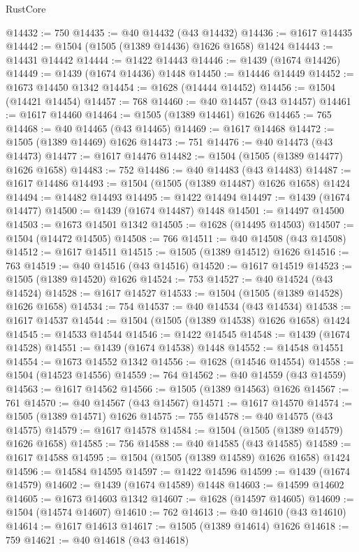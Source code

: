 \begin{lexlean}{RustCore}
\begin{coremodule}
@14432 := 750
@14435 := @40 @14432 (@43 @14432)
@14436 := @1617 @14435
@14442 := @1504 (@1505 (@1389 @14436) @1626 @1658) @1424
@14443 := @14431 @14442
@14444 := @1422 @14443
@14446 := @1439 (@1674 @14426)
@14449 := @1439 (@1674 @14436) @1448
@14450 := @14446 @14449
@14452 := @1673 @14450 @1342
@14454 := @1628 (@14444 @14452)
@14456 := @1504 (@14421 @14454)
@14457 := 768
@14460 := @40 @14457 (@43 @14457)
@14461 := @1617 @14460
@14464 := @1505 (@1389 @14461) @1626
@14465 := 765
@14468 := @40 @14465 (@43 @14465)
@14469 := @1617 @14468
@14472 := @1505 (@1389 @14469) @1626
@14473 := 751
@14476 := @40 @14473 (@43 @14473)
@14477 := @1617 @14476
@14482 := @1504 (@1505 (@1389 @14477) @1626 @1658)
@14483 := 752
@14486 := @40 @14483 (@43 @14483)
@14487 := @1617 @14486
@14493 := @1504 (@1505 (@1389 @14487) @1626 @1658) @1424
@14494 := @14482 @14493
@14495 := @1422 @14494
@14497 := @1439 (@1674 @14477)
@14500 := @1439 (@1674 @14487) @1448
@14501 := @14497 @14500
@14503 := @1673 @14501 @1342
@14505 := @1628 (@14495 @14503)
@14507 := @1504 (@14472 @14505)
@14508 := 766
@14511 := @40 @14508 (@43 @14508)
@14512 := @1617 @14511
@14515 := @1505 (@1389 @14512) @1626
@14516 := 763
@14519 := @40 @14516 (@43 @14516)
@14520 := @1617 @14519
@14523 := @1505 (@1389 @14520) @1626
@14524 := 753
@14527 := @40 @14524 (@43 @14524)
@14528 := @1617 @14527
@14533 := @1504 (@1505 (@1389 @14528) @1626 @1658)
@14534 := 754
@14537 := @40 @14534 (@43 @14534)
@14538 := @1617 @14537
@14544 := @1504 (@1505 (@1389 @14538) @1626 @1658) @1424
@14545 := @14533 @14544
@14546 := @1422 @14545
@14548 := @1439 (@1674 @14528)
@14551 := @1439 (@1674 @14538) @1448
@14552 := @14548 @14551
@14554 := @1673 @14552 @1342
@14556 := @1628 (@14546 @14554)
@14558 := @1504 (@14523 @14556)
@14559 := 764
@14562 := @40 @14559 (@43 @14559)
@14563 := @1617 @14562
@14566 := @1505 (@1389 @14563) @1626
@14567 := 761
@14570 := @40 @14567 (@43 @14567)
@14571 := @1617 @14570
@14574 := @1505 (@1389 @14571) @1626
@14575 := 755
@14578 := @40 @14575 (@43 @14575)
@14579 := @1617 @14578
@14584 := @1504 (@1505 (@1389 @14579) @1626 @1658)
@14585 := 756
@14588 := @40 @14585 (@43 @14585)
@14589 := @1617 @14588
@14595 := @1504 (@1505 (@1389 @14589) @1626 @1658) @1424
@14596 := @14584 @14595
@14597 := @1422 @14596
@14599 := @1439 (@1674 @14579)
@14602 := @1439 (@1674 @14589) @1448
@14603 := @14599 @14602
@14605 := @1673 @14603 @1342
@14607 := @1628 (@14597 @14605)
@14609 := @1504 (@14574 @14607)
@14610 := 762
@14613 := @40 @14610 (@43 @14610)
@14614 := @1617 @14613
@14617 := @1505 (@1389 @14614) @1626
@14618 := 759
@14621 := @40 @14618 (@43 @14618)

\end{coremodule}
\end{lexlean}
